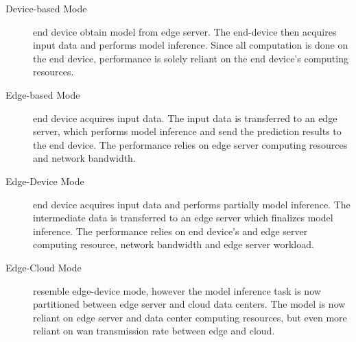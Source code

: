 \begin{description}
	\item[Device-based Mode] end device obtain model from edge server. The end-device then acquires input data and performs model inference. Since all computation is done on the end device, performance is solely reliant on the end device's computing resources.  
	\item[Edge-based Mode] end device acquires input data. The input data is transferred to an edge server, which performs model inference and send the prediction results to the end device. The performance relies on edge server computing resources and network bandwidth.
	\item[Edge-Device Mode] end device acquires input data and performs partially model inference. The intermediate data is transferred to an edge server which finalizes model inference. The performance relies on end device's and edge server computing resource, network bandwidth and edge server workload. 
	\item[Edge-Cloud Mode] resemble edge-device mode, however the model inference task is now partitioned between edge server and cloud data centers. The model is now reliant on edge server and data center computing resources, but even more reliant on \gls{wan} transmission rate between edge and cloud. 
\end{description}

